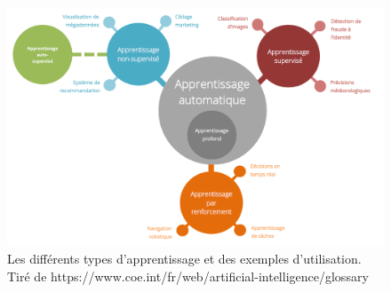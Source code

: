 \begin{figure}
  \centering
  \includegraphics[width=.95\textwidth]{./Chapitre2/figures/typeApprentissage.png}
  \caption{Les différents types d'apprentissage et des exemples d'utilisation. Tiré de https://www.coe.int/fr/web/artificial-intelligence/glossary}
  \label{fig:typesApprentissage}
\end{figure}
